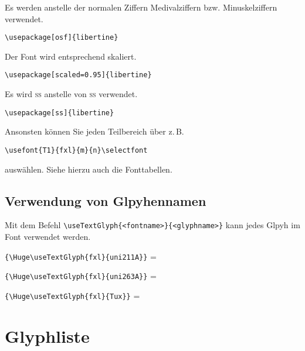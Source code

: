 \documentclass{fontdokuold}
\begin{document}
\begin{description}
\item [osf] Es werden anstelle der normalen Ziffern Medivalziffern bzw. Minuskelziffern verwendet.
\begin{lstlisting}
\usepackage[osf]{libertine}
\end{lstlisting}

\item [scaled] Der Font wird entsprechend skaliert.
\begin{lstlisting}
\usepackage[scaled=0.95]{libertine}
\end{lstlisting}

\item [ss] Es wird \textsc{ss} anstelle von \textsc{ß} verwendet.
\begin{lstlisting}
\usepackage[ss]{libertine}
\end{lstlisting}

\end{description}

Ansonsten können Sie jeden Teilbereich über z.\,B.
\begin{lstlisting}
\usefont{T1}{fxl}{m}{n}\selectfont
\end{lstlisting}
auswählen. Siehe hierzu auch die Fonttabellen.


\section{Verwendung von Glpyhennamen}

Mit dem Befehl \verb|\useTextGlyph{<fontname>}{<glyphname>}| kann jedes Glpyh im Font
verwendet werden.


\verb|{\Huge\useTextGlyph{fxl}{uni211A}}| = {\Huge{}} \par
\verb|{\Huge\useTextGlyph{fxl}{uni263A}}| = {\Huge{}} \par
\verb|{\Huge\useTextGlyph{fxl}{Tux}}| = {\Huge{}} \par


\chapter{Glyphliste}

\newcommand{\glyphTabEntry}[2]{%
\ifGylphExists{#1}{#2}{%
{\large\texttt{#2}\hfill\Huge\strut\useTextGlyph{#1}{#2}\par}}{}
}
\end{document}

